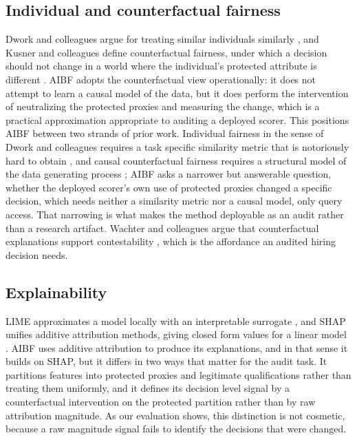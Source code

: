 \documentclass[conference]{IEEEtran}
\begin{document}
\subsection{Individual and counterfactual fairness}
Dwork and colleagues argue for treating similar individuals similarly
\cite{dwork}, and Kusner and colleagues define counterfactual fairness, under which a
decision should not change in a world where the individual's protected attribute is
different \cite{kusner}. AIBF adopts the counterfactual view operationally: it does
not attempt to learn a causal model of the data, but it does perform the intervention
of neutralizing the protected proxies and measuring the change, which is a practical
approximation appropriate to auditing a deployed scorer. This positions AIBF between two
strands of prior work. Individual fairness in the sense of Dwork and colleagues requires
a task specific similarity metric that is notoriously hard to obtain \cite{dwork}, and
causal counterfactual fairness requires a structural model of the data generating
process \cite{kusner}; AIBF asks a narrower but answerable question, whether the
deployed scorer's own use of protected proxies changed a specific decision, which needs
neither a similarity metric nor a causal model, only query access. That narrowing is
what makes the method deployable as an audit rather than a research artifact. Wachter and colleagues
argue that counterfactual explanations support contestability \cite{wachter}, which
is the affordance an audited hiring decision needs.

\subsection{Explainability}
LIME approximates a model locally with an interpretable surrogate \cite{lime}, and
SHAP unifies additive attribution methods, giving closed form values for a linear
model \cite{shap}. AIBF uses additive attribution to produce its explanations, and
in that sense it builds on SHAP, but it differs in two ways that matter for the audit
task. It partitions features into protected proxies and legitimate qualifications
rather than treating them uniformly, and it defines its decision level signal by a
counterfactual intervention on the protected partition rather than by raw attribution
magnitude. As our evaluation shows, this distinction is not cosmetic, because a raw
magnitude signal fails to identify the decisions that were changed.
\end{document}
